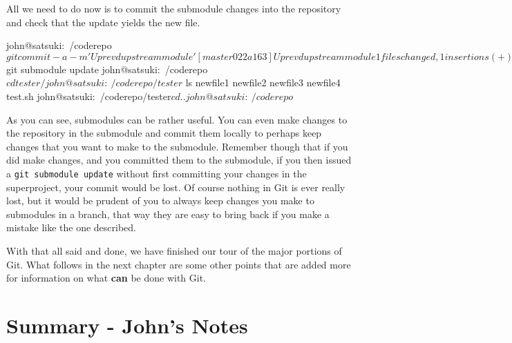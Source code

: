 All we need to do now is to commit the submodule changes into the repository and check that the update yields the new file.

\begin{code}
john@satsuki:~/coderepo$ git commit -a -m 'Up revd upstream module'
[master 022a163] Up revd upstream module
 1 files changed, 1 insertions(+), 1 deletions(-)
john@satsuki:~/coderepo$ git submodule update
john@satsuki:~/coderepo$ cd tester/
john@satsuki:~/coderepo/tester$ ls
newfile1  newfile2  newfile3  newfile4  test.sh
john@satsuki:~/coderepo/tester$ cd ..
john@satsuki:~/coderepo$
\end{code}

As you can see, submodules can be rather useful.
You can even make changes to the repository in the submodule and commit them locally to perhaps keep changes that you want to make to the submodule.
Remember though that if you did make changes, and you committed them to the submodule,
if you then issued a \texttt{git submodule update} without first committing your changes in the superproject, your commit would be lost.
Of course nothing in Git is ever really lost, but it would be prudent of you to always keep changes you make to submodules in a branch,
that way they are easy to bring back if you make a mistake like the one described.

With that all said and done, we have finished our tour of the major portions of Git.
What follows in the next chapter are some other points that are added more for information on what \textbf{can} be done with Git.

\clearpage

\section{Summary - John's Notes}
